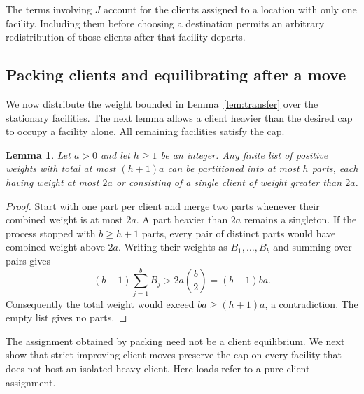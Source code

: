 \documentclass[11pt]{amsart}
\newtheorem{lemma}[theorem]{Lemma}
\theoremstyle{definition}
\begin{document}
The terms involving $J$ account for the clients assigned to a location with only one facility. Including them before choosing a destination permits an arbitrary redistribution of those clients after that facility departs.

\subsection{Packing clients and equilibrating after a move}\label{subsec:repair}
We now distribute the weight bounded in Lemma~\ref{lem:transfer} over the stationary facilities. The next lemma allows a client heavier than the desired cap to occupy a facility alone. All remaining facilities satisfy the cap.

\begin{lemma}\label{lem:packing}
Let $a>0$ and let $h\ge1$ be an integer. Any finite list of positive weights with total at most $(h+1)a$ can be partitioned into at most $h$ parts, each having weight at most $2a$ or consisting of a single client of weight greater than $2a$.
\end{lemma}
\begin{proof}
Start with one part per client and merge two parts whenever their combined weight is at most $2a$. A part heavier than $2a$ remains a singleton. If the process stopped with $b\ge h+1$ parts, every pair of distinct parts would have combined weight above $2a$. Writing their weights as $B_1,\ldots,B_b$ and summing over pairs gives
\[
 (b-1)\sum_{j=1}^bB_j
 >2a\binom b2=(b-1)ba.
\]
Consequently the total weight would exceed $ba\ge(h+1)a$, a contradiction. The empty list gives no parts.
\end{proof}

The assignment obtained by packing need not be a client equilibrium. We next show that strict improving client moves preserve the cap on every facility that does not host an isolated heavy client. Here loads refer to a pure client assignment.
\end{document}
